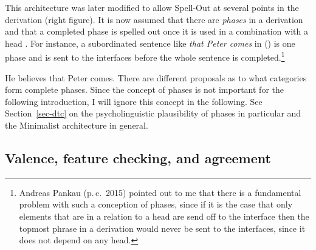 This architecture was later modified to allow Spell-Out at several points in the derivation (right figure). It is now
assumed that there are \emph{phases} in a derivation and that a completed phase is spelled out once it is
used in a combination with a head \citep{Chomsky2008a}. For instance, a subordinated sentence like \emph{that Peter comes} in () is one
phase and is sent to the interfaces before the whole sentence is completed.\footnote{%
  Andreas Pankau (p.\,c.\, 2015) pointed out to me that there is a fundamental problem with such a
  conception of phases, since if it is the case that only elements that are in a relation to a head
  are send off to the interface then the topmost phrase in a derivation would never be sent to the interfaces, since it does not depend on any head.
}

\ea
He believes that Peter comes.
\z
There are different proposals as to what categories form complete phases. Since the concept of
phases is not important for the following introduction, I will ignore this concept in the following. See Section~\ref{sec-dtc} on the psycholinguistic plausibility of phases in
particular and the Minimalist architecture in general. 

\subsection{Valence, feature checking, and agreement}
\label{sec-features-minimalism}

